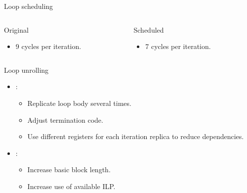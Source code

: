 \begin{frame}[t]{Loop scheduling}

\begin{columns}[T]

\begin{column}{.45\textwidth}
\begin{block}{Original}

\end{block}

\begin{itemize}
  \item 9 cycles per iteration.
\end{itemize}
\end{column}

\pause
\begin{column}{.45\textwidth}
\begin{block}{Scheduled}

\end{block}
\begin{itemize}
  \item 7 cycles per iteration.
\end{itemize}
\end{column}

\end{columns}
\end{frame}

\begin{frame}[t]{Loop unrolling}
\begin{itemize}
  \item {}:
    \begin{itemize}
      \item Replicate loop body several times.
      \item Adjust termination code.
      \item Use different registers for each iteration replica to reduce dependencies.
    \end{itemize}

  \item {}:
    \begin{itemize}
      \item Increase basic block length.
      \item Increase use of available ILP.
    \end{itemize}
\end{itemize}
\end{frame}

